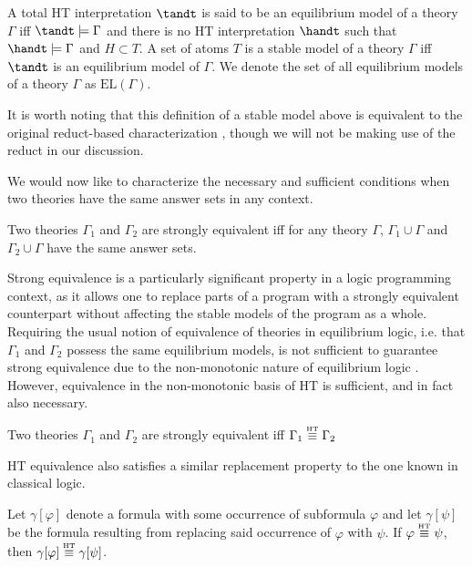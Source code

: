 \begin{definition}
  A total HT interpretation $\tandt$ is said to be an equilibrium
  model of a theory $\Gamma$ iff $\tandt \models \Gamma$ and there is
  no HT interpretation $\handt$ such that $\handt \models \Gamma$ and
  $H \subset T$. A set of atoms $T$ is a stable model of a theory
  $\Gamma$ iff $\tandt$ is an equilibrium model of $\Gamma$. We denote
  the set of all equilibrium models of a theory $\Gamma$ as
  $\text{EL}(\Gamma)$.
\end{definition}

It is worth noting that this definition of a stable model above is
equivalent to the original reduct-based characterization
\cite{lipeva01a}, though we will not be making use of the reduct in
our discussion. 

We would now like to characterize the necessary and sufficient
conditions when two theories have the same answer sets in any context.

\begin{definition}
  Two theories $\Gamma_1$ and $\Gamma_2$ are strongly equivalent iff for
  any theory $\Gamma$, $\Gamma_1 \cup \Gamma$ and
  $\Gamma_2 \cup \Gamma$ have the same answer sets.
\end{definition}

Strong equivalence is a particularly significant property in a logic
programming context, as it allows one to replace parts of a program
with a strongly equivalent counterpart without affecting the stable
models of the program as a whole. Requiring the usual notion of
equivalence of theories in equilibrium logic, i.e. that $\Gamma_1$ and
$\Gamma_2$ possess the same equilibrium models, is not sufficient to
guarantee strong equivalence due to the non-monotonic nature of
equilibrium logic \cite{lipeva01a}.  However, equivalence in the
non-monotonic basis of HT is sufficient, and in fact also necessary.

\begin{proposition}
  Two theories $\Gamma_1$ and $\Gamma_2$ are strongly equivalent
  iff $\Gamma_1 \stackrel{\normalfont\mbox{\tiny HT}}{\equiv} \Gamma_2$
\end{proposition}

HT equivalence also satisfies a similar replacement property
to the one known in classical logic.

\begin{proposition}
  Let $\gamma[\varphi]$ denote a formula with some occurrence of
  subformula $\varphi$ and let $\gamma[\psi]$ be the formula resulting
  from replacing said occurrence of $\varphi$ with $\psi$. If
  $\varphi \stackrel{\normalfont\mbox{\tiny HT}}{\equiv} \psi$, then $\gamma[\varphi] \stackrel{\normalfont\mbox{\tiny HT}}{\equiv} \gamma[\psi]$.
\end{proposition}
